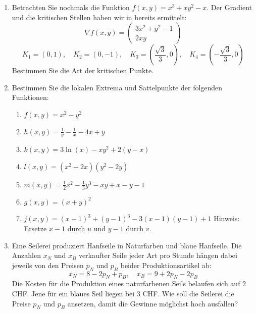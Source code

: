 \begin{ueb}
	{}{}

	\begin{enumerate}
		\item Betrachten Sie nochmals die Funktion \(f(x,y) = x^3 + xy^2 - x\). Der Gradient und die kritischen Stellen haben wir in  bereits ermittelt:
		      \[
			      \nabla f(x,y) = \begin{pmatrix}
				      3x^2 + y^2 - 1 \\
				      2xy
			      \end{pmatrix}
		      \]
		      \[
			      K_1 = (0,1), \quad K_2 = (0,-1), \quad K_3 = \left(\frac{\sqrt{3}}{3}, 0\right), \quad K_4 = \left(-\frac{\sqrt{3}}{3}, 0\right)
		      \]
		      Bestimmen Sie die Art der kritischen Punkte.

		\item Bestimmen Sie die lokalen Extrema und Sattelpunkte der folgenden Funktionen:
		      \begin{enumerate}
			      \item \(f(x,y) = x^2 - y^2\)
			      \item \(h(x,y) = \frac{1}{y} - \frac{1}{x} - 4x + y\)
			      \item \(k(x,y) = 3 \ln(x) - xy^2 + 2(y-x)\)
			      \item \(l(x,y) = (x^2 - 2x)(y^2 - 2y)\)
			      \item \(m(x,y) = \frac{1}{2}x^2 - \frac{1}{3}y^3 - xy + x - y - 1\)
			      \item  \(g(x,y) = (x+y)^2\)
			      \item \(j(x,y) = (x-1)^3 + (y-1)^3 - 3(x-1)(y-1) + 1\) Hinweis: Ersetze \(x-1\) durch \(u\) und \(y-1\) durch \(v\).
		      \end{enumerate}

		\item Eine Seilerei produziert Hanfseile in Naturfarben und blaue Hanfseile. Die Anzahlen \(x_N\) und \(x_B\) verkaufter Seile jeder Art pro Stunde hängen dabei jeweils von den Preisen \(p_N\) und \(p_B\) beider Produktionsartikel ab:
		      \[
			      x_N = 8 - 2p_N + p_B, \quad x_B = 9 + 2p_N - 2p_B
		      \]
		      Die Kosten für die Produktion eines naturfarbenen Seils belaufen sich auf 2 CHF. Jene für ein blaues Seil liegen bei 3 CHF. Wie soll die Seilerei die Preise \(p_N\) und \(p_B\) ansetzen, damit die Gewinne möglichst hoch ausfallen?
	\end{enumerate}

\end{ueb}

